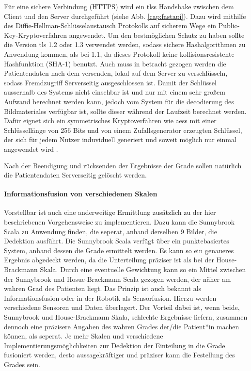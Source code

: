 Für eine sichere Verbindung (HTTPS) wird ein \Acp{tls} Handshake zwischen dem Client und den Server durchgeführt (siehe Abb. \ref{cap:fastapi}). Dazu wird mithilfe des Diffie-Hellman-Schlüsselaustausch Protokolls auf sicherem Wege ein Public-Key-Kryptoverfahren angewendet. Um den bestmöglichen Schutz zu haben sollte die Version \ac{tls} 1.2 oder 1.3 verwendet werden, sodass sichere Hashalgorithmen zu Anwendung kommen, als bei 1.1, da dieses Protokoll keine kollisionsresistente Hashfunktion (SHA-1) benutzt. Auch muss in betracht gezogen werden die Patientendaten nach dem versenden, lokal auf dem Server zu verschlüsseln, sodass Fremdzugriff Serverseitig ausgeschlossen ist. Damit der Schlüssel ausserhalb des Systems nicht einsehbar ist und nur mit einem sehr großem Aufwand berechnet werden kann, jedoch vom System für die decodierung des Bildmateriales verfügbar ist, sollte dieser während der Laufzeit berechnet werden. Dafür eignet sich ein symmetrisches Kryptoverfahren wie \Acp{aes} mit einer Schlüssellänge von 256 Bits und von einem Zufallsgenerator erzeugten Schlüssel, der sich für jedem Nutzer induviduell generiert und soweit möglich nur einmal angewendet wird \cite{bsi}.

Nach der Beendigung und rücksenden der Ergebnisse der Grade sollen natürlich die Patientendaten Serverseitig gelöscht werden.

\paragraph{Informationsfusion von verschiedenen Skalen}
Vorstellbar ist auch eine anderweitige Ermittlung zusätzlich zu der hier beschriebenen Vorgehensweise zu implementieren. Dazu kann die Sunnybrook Scala zu Anwendung finden, die seperat, anhand derselben 9 Bilder, die Dedektion ausführt. Die Sunnybrook Scala verfügt über ein punktebasiertes System, anhand dessen die Grade ermittelt werden. Es kann so ein genaueres Ergebnis abgedeckt werden, da die Unterteilung präziser ist als bei der House-Brackmann Skala. Durch eine eventuelle Gewichtung kann so ein Mittel zwischen der Sunnybrook und Hosue-Brackmann Scala gezogen werden, der näher am wahren Grad des Patienten liegt. Das Prinzip ist auch bekannt als Informationsfusion oder in der Robotik als Sensorfusion. Hierzu werden verschiedene Sensoren und Daten überlagert. Der Vorteil dabei ist, wenn beide, Sunnybrook und House-Brackmann Skala, schlechte Ergebnisse liefern, zusammen dennoch eine präzisere Angaben des wahren Grades der/die Patient*in machen können, als seperat. Je mehr Skalen und verschiedene Implementierungsmöglichkeiten zur Dedektion der Einteilung in die Grade fusioniert werden, desto aussagekräftiger und präziser kann die Festellung des Grades sein.
